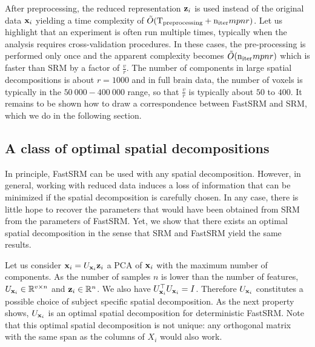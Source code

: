 \documentclass{article}
\newcommand{\bt}[1]{\todo[color=orange, inline=True]{BT: #1}}
\begin{document}
After preprocessing, the reduced representation $\mathbf{z}_i$ is used instead of the
original data $\mathbf{x}_i$ yielding a time complexity of $\tilde{O}(
\mathrm{T_{preprocessing}} + \mathrm{n_{iter}} mpnr)$.
%
Let us highlight that an experiment is often run multiple times,
typically when the analysis requires cross-validation procedures.
%
In these cases,
the pre-processing is performed only once and the apparent complexity becomes
$\tilde{O}(\mathrm{n_{iter}} mpnr)$ which is faster than SRM by
a factor of $\frac{v}{r}$.
%
The number of components in large spatial decompositions is about $r=1000$ and in full brain data,
the number of voxels is typically in the  $50~000 - 400~000$ range, so that $\frac{v}{r}$ is typically about
$50$ to $400$.
%
It remains to be shown how to draw a correspondence between FastSRM
and SRM, which we do in the following section.
%


\subsection{A class of optimal spatial decompositions}
\label{sec:optimal_atlas}
In principle, FastSRM can be used with any spatial decomposition.
%
However, in general, working with reduced data induces a loss of information
that can be minimized if the spatial decomposition is carefully chosen.
%
In any case, there is little hope to recover the parameters that would have been
obtained from SRM from the parameters of FastSRM.
%
Yet, we show that there exists an optimal spatial decomposition in the
sense that SRM and FastSRM yield the same results.


Let us consider $\mathbf{x}_i = U_{\mathbf{x}_i} \mathbf{z}_i$
%
%
a PCA of $\mathbf{x}_i$ with the maximum
number of components.
%
As the number of
samples $n$ is lower than the number of features, $U_{\mathbf{x}_i} \in \mathbb{R}^{v \times
  n}$ and $\mathbf{z}_i \in \mathbb{R}^{n}$.
%
We also have $U_{\mathbf{x}_i}^{\top}U_{\mathbf{x}_i} = I$.
%
Therefore $U_{\mathbf{x}_i}$ constitutes a possible choice of subject specific spatial decomposition.
%
As the next property shows, $U_{\mathbf{x}_i}$ is an optimal spatial decomposition for deterministic
FastSRM. Note that this optimal spatial decomposition is not unique: any orthogonal matrix with
the same span as the columns of $X_i$ would also work.
%
\end{document}
